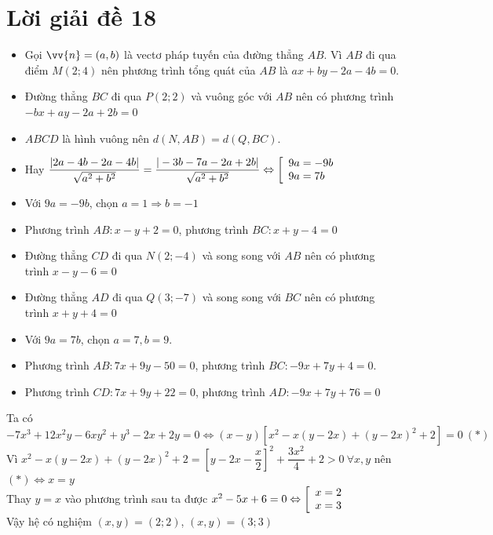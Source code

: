 \section{Lời giải đề 18}
\lgi 
\begin{itemize}[label=,leftmargin=*]
\item Gọi $\vv{n}=(a,b)$ là vectơ pháp tuyến của đường thẳng $AB$. Vì $AB$ đi qua điểm $M(2;4)$ nên phương trình tổng quát của $AB$ là $ax+by-2a-4b=0$. 
\item Đường thẳng $BC$ đi qua $P(2;2)$ và vuông góc với $AB$ nên có phương trình $-bx+ay-2a+2b=0$ 
\item $ABCD$ là hình vuông nên $d(N,AB)=d(Q,BC)$.
\item Hay $\dfrac{|2a-4b-2a-4b|}{\sqrt{a^2+b^2}}=\dfrac{|-3b-7a-2a+2b|}{\sqrt{a^2+b^2}}\Leftrightarrow \left[\begin{array}{ll}9a=-9b \\ 9a=7b\end{array}\right.$
\item Với $9a=-9b$, chọn $a=1\Rightarrow b=-1$
\item Phương trình $AB:x-y+2=0$, phương trình $BC:x+y-4=0$
\item Đường thẳng $CD$ đi qua $N(2;-4)$ và song song với $AB$ nên có phương trình $x-y-6=0$
\item Đường thẳng $AD$ đi qua $Q(3;-7)$ và song song với $BC$ nên có phương trình $x+y+4=0$
\item Với $9a=7b$, chọn $a=7,b=9$.
\item Phương trình $AB:7x+9y-50=0$, phương trình $BC:-9x+7y+4=0$.
\item Phương trình $CD:7x+9y+22=0$, phương trình $AD:-9x+7y+76=0$
\end{itemize}

\lgi 
 Ta có $-7x^3+12x^2y-6xy^2+y^3-2x+2y=0\Leftrightarrow (x-y)\left[x^2-x(y-2x)+(y-2x)^2+2 \right]=0 \ (*)$ \\
 Vì $x^2-x(y-2x)+(y-2x)^2+2=\left[y-2x-\dfrac{x}{2} \right]^2+\dfrac{3x^2}{4}+2 >0 \ \forall x,y$ nên $(*)\Leftrightarrow x=y$\\
 Thay $y=x$ vào phương trình sau ta được $x^2-5x+6=0 \Leftrightarrow \left[\begin{array}{ll}x=2\\ x=3\end{array}\right.$\\
 Vậy hệ có nghiệm $(x,y)=(2;2)$, $(x,y)=(3;3)$
 
